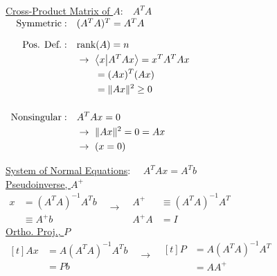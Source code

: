 \documentclass[12pt]{article}
\begin{document}
\vspace{10pt}
\begin{minipage}[t]{.49\textwidth}
	\underline{Cross-Product Matrix of \(A\)}:\ \ \(\boxed{A^T A}\)\\[10pt]
	\(\begin{array}{r l}
		\text{Symmetric}: & (A^T A)^T = A^T A\\[10pt]
		\text{Pos. Def.}: & \begin{aligned}[t]
				&\text{rank}(A) = n\\
				&\rightarrow \ \begin{aligned}[t]
						&\big\langle x \big| A^T Ax \big\rangle = x^T A^T A x\\
						&= (Ax)^T (Ax) \\
						&= \Vert Ax \Vert^2 \geq 0
					\end{aligned} \\
			\end{aligned} \\[2.2cm]
		\text{Nonsingular}: & \begin{aligned}[t]
				&A^T A x = 0 \\
				&\rightarrow\ \Vert Ax \Vert^2 = 0 = Ax \\
				&\rightarrow\ (x = 0)
			\end{aligned} 
	\end{array}\)	
\end{minipage}
\hfill
\begin{minipage}[t]{.49\textwidth}
	\underline{System of Normal Equations}: \ \ \(\boxed{A^T Ax = A^T b}\)\\[20pt]
	\underline{Pseudoinverse, \(A^+\)}\\[10pt]
	\(
		\boxed{ \begin{aligned}
			x &= (A^T A)^{-1} A^T b \\[3pt]
			&\equiv A^+ b
		\end{aligned} }
		\ \ \ \rightarrow \ \ \
		\boxed{ \begin{aligned}
			A^+ &\equiv (A^T A)^{-1} A^T \\
			A^+ A &= I
		\end{aligned} }
	\)\\[20pt]
	\underline{Ortho. Proj., \(P\)}\\[10pt]
	\(
		\boxed{ \begin{aligned}[t]
			Ax &= A (A^T A)^{-1} A^T b \\
			&= Pb
		\end{aligned} }
		\ \ \ \rightarrow \ \ \
		\boxed{ \begin{aligned}[t]
			P &= A (A^T A)^{-1} A^T \\
			&= A A^+ 
		\end{aligned} }
	\)
\end{minipage}
\end{document}
